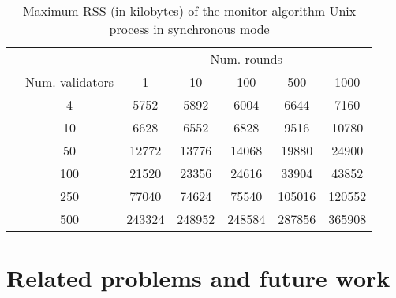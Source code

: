 \documentclass[a4paper,11pt,oneside]{report}
\begin{document}
\begin{table}[]
\centering
\begin{tabular}{l|c|c|c|c|c|c|}
\cline{2-7}
                  &  & \multicolumn{5}{c|}{Num. rounds} \\ \cline{2-7} 
\multirow{7}{*}{} & Num. validators & 1   & 10   & 100  & 500  & 1000  \\ \cline{2-7} 
                  & 4               & 5752  & 5892  & 6004 & 6644 & 7160      \\ \cline{2-7} 
                  & 10              & 6628    & 6552     &  6828   & 9516  & 10780      \\ \cline{2-7} 
                  & 50              & 12772    & 13776    & 14068     &  19880    &  24900     \\ \cline{2-7} 
                  & 100             & 21520  & 23356    & 24616  & 33904     & 43852      \\ \cline{2-7} 
                  & 250             &  77040   & 74624     &  75540    &  105016    &  120552     \\ \cline{2-7} 
                  & 500             & 243324    & 248952     &  248584    &  287856    & 365908      \\ \cline{2-7} 
\end{tabular}
\caption{Maximum RSS (in kilobytes) of the monitor algorithm Unix process in synchronous mode}
\end{table}


\chapter{Related problems and future work}
\end{document}
